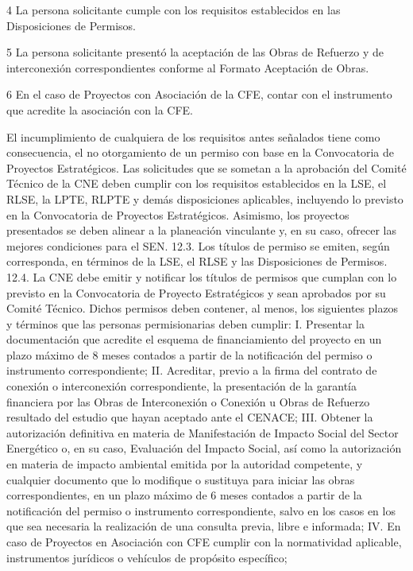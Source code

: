  
 4
 La persona solicitante cumple con los requisitos establecidos en las Disposiciones de Permisos.
 
 
 5
 La persona solicitante presentó la aceptación de las Obras de Refuerzo y de interconexión correspondientes conforme al Formato Aceptación de Obras.
 
 
 6
 En el caso de Proyectos con Asociación de la CFE, contar con el instrumento que acredite la asociación con la CFE.
 
 
 
El incumplimiento de cualquiera de los requisitos antes señalados tiene como consecuencia, el no otorgamiento de un permiso con base en la Convocatoria de Proyectos Estratégicos.
Las solicitudes que se sometan a la aprobación del Comité Técnico de la CNE deben cumplir con los requisitos establecidos en la LSE, el RLSE, la LPTE, RLPTE y demás disposiciones aplicables, incluyendo lo previsto en la Convocatoria de Proyectos Estratégicos. Asimismo, los proyectos presentados se deben alinear a la planeación vinculante y, en su caso, ofrecer las mejores condiciones para el SEN.
12.3. Los títulos de permiso se emiten, según corresponda, en términos de la LSE, el RLSE y las Disposiciones de Permisos.
12.4. La CNE debe emitir y notificar los títulos de permisos que cumplan con lo previsto en la Convocatoria de Proyecto Estratégicos y sean aprobados por su Comité Técnico. Dichos permisos deben contener, al menos, los siguientes plazos y términos que las personas permisionarias deben cumplir:
I. Presentar la documentación que acredite el esquema de financiamiento del proyecto en un plazo máximo de 8 meses contados a partir de la notificación del permiso o instrumento correspondiente;
II. Acreditar, previo a la firma del contrato de conexión o interconexión correspondiente, la presentación de la garantía financiera por las Obras de Interconexión o Conexión u Obras de Refuerzo resultado del estudio que hayan aceptado ante el CENACE;
III. Obtener la autorización definitiva en materia de Manifestación de Impacto Social del Sector Energético o, en su caso, Evaluación del Impacto Social, así como la autorización en materia de impacto ambiental emitida por la autoridad competente, y cualquier documento que lo modifique o sustituya para iniciar las obras correspondientes, en un plazo máximo de 6 meses contados a partir de la notificación del permiso o instrumento correspondiente, salvo en los casos en los que sea necesaria la realización de una consulta previa, libre e informada;
IV. En caso de Proyectos en Asociación con CFE cumplir con la normatividad aplicable, instrumentos jurídicos o vehículos de propósito específico;
